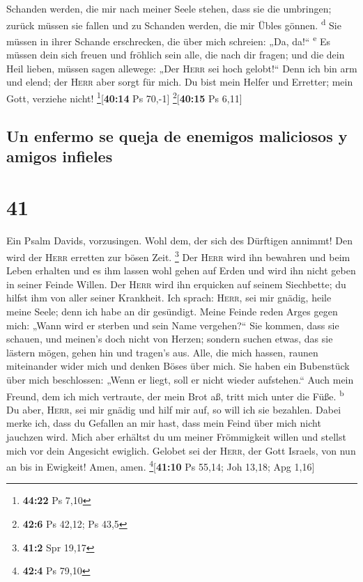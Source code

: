 Schanden werden, die mir nach meiner Seele stehen, dass sie die
umbringen; zurück müssen sie fallen und zu Schanden werden, die mir
Übles gönnen. \textsuperscript{d}  Sie müssen in ihrer
Schande erschrecken, die über mich schreien: „Da, da!{}``
\textsuperscript{e}  Es müssen dein sich freuen und
fröhlich sein alle, die nach dir fragen; und die dein Heil lieben,
müssen sagen allewege: „Der \textsc{Herr} sei hoch gelobt!{}``
 Denn ich bin arm und elend; der \textsc{Herr} aber sorgt
für mich. Du bist mein Helfer und Erretter; mein Gott, verziehe nicht!
\footnote{\textbf{44:22} Ps 7,10}{[}\textbf{40:14} Ps 70,-1{]}
\footnote{\textbf{42:6} Ps 42,12; Ps 43,5}{[}\textbf{40:15} Ps 6,11{]}

\hypertarget{un-enfermo-se-queja-de-enemigos-maliciosos-y-amigos-infieles}{%
\subsection{Un enfermo se queja de enemigos maliciosos y amigos
infieles}\label{un-enfermo-se-queja-de-enemigos-maliciosos-y-amigos-infieles}}

\hypertarget{section-40}{%
\section{41}\label{section-40}}

 Ein Psalm Davids, vorzusingen.  Wohl dem,
der sich des Dürftigen annimmt! Den wird der \textsc{Herr} erretten zur
bösen Zeit. \footnote{\textbf{41:2} Spr 19,17}  Der
\textsc{Herr} wird ihn bewahren und beim Leben erhalten und es ihm
lassen wohl gehen auf Erden und wird ihn nicht geben in seiner Feinde
Willen.  Der \textsc{Herr} wird ihn erquicken auf seinem
Siechbette; du hilfst ihm von aller seiner Krankheit.  Ich
sprach: \textsc{Herr}, sei mir gnädig, heile meine Seele; denn ich habe
an dir gesündigt.  Meine Feinde reden Arges gegen mich:
„Wann wird er sterben und sein Name vergehen?{}``  Sie
kommen, dass sie schauen, und meinen's doch nicht von Herzen; sondern
suchen etwas, das sie lästern mögen, gehen hin und tragen's aus.
 Alle, die mich hassen, raunen miteinander wider mich und
denken Böses über mich.  Sie haben ein Bubenstück über
mich beschlossen: „Wenn er liegt, soll er nicht wieder aufstehen.``
 Auch mein Freund, dem ich mich vertraute, der mein Brot
aß, tritt mich unter die Füße. \textsuperscript{b}  Du
aber, \textsc{Herr}, sei mir gnädig und hilf mir auf, so will ich sie
bezahlen.  Dabei merke ich, dass du Gefallen an mir hast,
dass mein Feind über mich nicht jauchzen wird.  Mich aber
erhältst du um meiner Frömmigkeit willen und stellst mich vor dein
Angesicht ewiglich.  Gelobet sei der \textsc{Herr}, der
Gott Israels, von nun an bis in Ewigkeit! Amen, amen.
\footnote{\textbf{42:4} Ps 79,10}{[}\textbf{41:10} Ps 55,14; Joh 13,18;
Apg 1,16{]}

